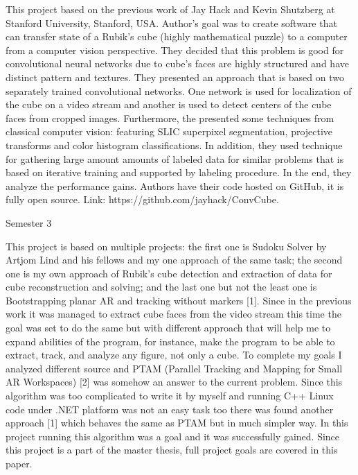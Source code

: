 \documentclass[../main]{subfiles}
\begin{document}
This project based on the previous work of Jay Hack and Kevin Shutzberg at Stanford University, Stanford, USA. Author’s goal was to create software that can transfer state of a Rubik’s cube (highly mathematical puzzle) to a computer from a computer vision perspective. They decided that this problem is good for convolutional neural networks due to cube’s faces are highly structured and have distinct pattern and textures.
They presented an approach that is based on two separately trained convolutional networks. One network is used for localization of the cube on a video stream and another is used to detect centers of the cube faces from cropped images. Furthermore, the presented some techniques from classical computer vision: featuring SLIC superpixel segmentation, projective transforms and color histogram classifications. In addition, they used technique for gathering large amount amounts of labeled data for similar problems that is based on iterative training and supported by labeling procedure. In the end, they analyze the performance gains. Authors have their code hosted on GitHub, it is fully open source. Link: https://github.com/jayhack/ConvCube.

Semester 3

This project is based on multiple projects: the first one is Sudoku Solver by Artjom Lind and his fellows and my one approach of the same task; the second one is my own approach of Rubik’s cube detection and extraction of data for cube reconstruction and solving; and the last one but not the least one is Bootstrapping planar AR and tracking without markers [1]. Since in the previous work it was managed to extract cube faces from the video stream this time the goal was set to do the same but with different approach that will help me to expand abilities of the program, for instance, make the program to be able to extract, track, and analyze any figure, not only a cube. To complete my goals I analyzed different source and PTAM (Parallel Tracking and Mapping for Small AR Workspaces) [2] was somehow an answer to the current problem. Since this algorithm was too complicated to write it by myself and running C++ Linux code under .NET platform was not an easy task too there was found another approach [1] which behaves the same as PTAM but in much simpler way. In this project running this algorithm was a goal and it was successfully gained. Since this project is a part of the master thesis, full project goals are covered in this paper.
\end{document}
